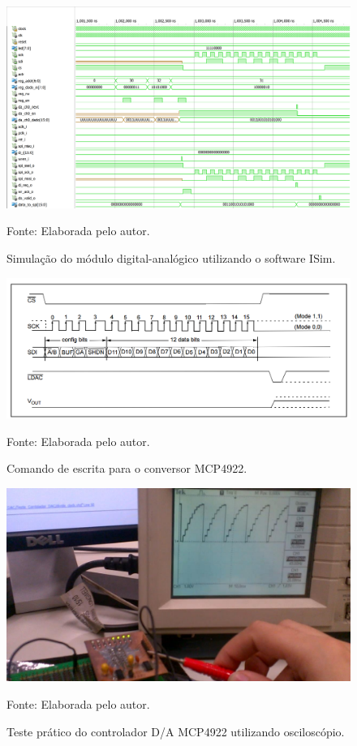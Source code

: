 \begin{figure}[!htb]
	\centering
	\caption{Simulação do módulo digital-analógico utilizando o software ISim.}
	\includegraphics[scale = .8, angle = 90]{Imagens/ISim_DAC_.pdf}
	
	Fonte: Elaborada pelo autor.
	
	\label{ISim_DAC}
\end{figure}

\begin{figure}[!htb]
	\centering
	\caption{Comando de escrita para o conversor MCP4922.}
	\includegraphics[scale = .5]{Imagens/WriteCommandMCP4922}
	
	Fonte: Elaborada pelo autor.
	
	\label{WriteCommandMCP4922}
\end{figure}

\begin{figure}[!htb]
	\centering
	\caption{Teste prático do controlador D/A MCP4922 utilizando osciloscópio.}
	\includegraphics[scale = .7, angle = 90]{Imagens/teste_conversor_DAC}
	
	Fonte: Elaborada pelo autor.
	
	\label{teste_conversor_DAC}
\end{figure}

